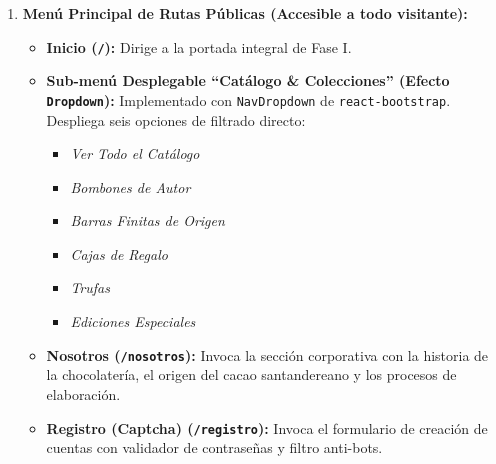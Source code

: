 \documentclass[12pt,letterpaper]{article}
\begin{document}
\begin{enumerate}[leftmargin=1.2cm]
  \item \textbf{Menú Principal de Rutas Públicas (Accesible a todo visitante):}
    \begin{itemize}
      \item \textbf{Inicio (\texttt{/}):} Dirige a la portada integral de Fase I.
      \item \textbf{Sub-menú Desplegable ``Catálogo \& Colecciones'' (Efecto \texttt{Dropdown}):} Implementado con \texttt{NavDropdown} de \texttt{react-bootstrap}. Despliega seis opciones de filtrado directo:
        \begin{itemize}
          \item \textit{Ver Todo el Catálogo}
          \item \textit{Bombones de Autor}
          \item \textit{Barras Finitas de Origen}
          \item \textit{Cajas de Regalo}
          \item \textit{Trufas}
          \item \textit{Ediciones Especiales}
        \end{itemize}
      \item \textbf{Nosotros (\texttt{/nosotros}):} Invoca la sección corporativa con la historia de la chocolatería, el origen del cacao santandereano y los procesos de elaboración.
      \item \textbf{Registro (Captcha) (\texttt{/registro}):} Invoca el formulario de creación de cuentas con validador de contraseñas y filtro anti-bots.
    \end{itemize}


\end{enumerate}
\end{document}
